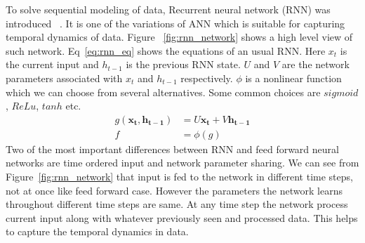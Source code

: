 \documentclass[10pt,twocolumn,letterpaper]{article}
\begin{document}
To solve sequential modeling of data, Recurrent neural network (RNN) was introduced ~\cite{DBLP:journals/corr/Lipton15}. It is one of the variations of ANN which is suitable for capturing temporal dynamics of data. Figure ~\ref{fig:rnn_network} shows a high level view of such network. 
Eq~\ref{eq:rnn_eq} shows the equations of an usual RNN. Here $x_t$ is the current input and $h_{t-1}$ is the previous RNN state. $U$ and $V$ are the network parameters associated with $x_t$ and $h_{t-1}$ respectively. $\phi$ is a nonlinear function which we can choose from several alternatives. Some common choices are $sigmoid$, $ReLu$, $tanh$ etc.
\begin{equation}
\label{eq:rnn_eq}
\begin{aligned}
g(\mathbf{x_t}, \mathbf{h_{t-1}}) & = U\mathbf{x_t} + V\mathbf{h_{t-1}} \\ f & = \phi(g)
\end{aligned}
\end{equation} 
Two of the most important differences between RNN and feed forward neural networks are time ordered input and network parameter sharing. We can see from Figure~\ref{fig:rnn_network} that input is fed to the network in different time steps, not at once like feed forward case. However the parameters the network learns throughout different time steps are same. At any time step the network process current input along with whatever previously seen and processed data. This helps to capture the temporal dynamics in data. 
\end{document}
